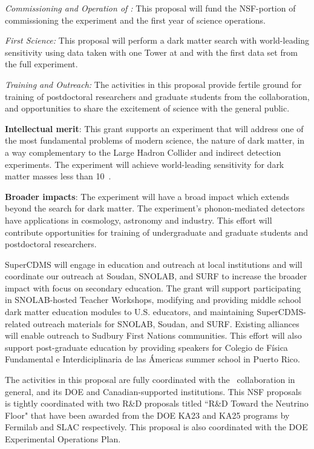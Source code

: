{\it Commissioning and Operation of \scs:} This proposal will fund the NSF-portion of commissioning the \scs experiment and the first year of science operations.

{\it First \scs Science:} This proposal will perform a dark matter search with  world-leading sensitivity using data taken with one \scs Tower at \cute and with the first data set from the full \scs experiment.

{\it Training and Outreach:} The activities in this proposal provide fertile ground for training of postdoctoral researchers and graduate students from the \SuperCDMS collaboration, and opportunities to share the excitement of science with the general public.

\textbf{Intellectual merit}: This grant supports an experiment that will address one of the most fundamental problems of modern science, the nature of dark matter, in a way complementary to the Large Hadron Collider and indirect detection experiments. The \scs experiment will achieve world-leading sensitivity for dark matter  masses less than 10~\gev.

\textbf{Broader impacts}: The \scs experiment will have a broad impact which extends beyond the search for dark matter. The experiment's phonon-mediated detectors have applications in cosmology, astronomy and industry. This effort will contribute opportunities for training of undergraduate and graduate students and postdoctoral researchers.

SuperCDMS will engage in education and outreach at local institutions and will coordinate our outreach at Soudan, SNOLAB, and SURF to increase the broader impact with focus on secondary education. The grant will support participating in SNOLAB-hosted Teacher Workshops, modifying and providing middle school dark matter education modules to U.S. educators, and maintaining SuperCDMS-related outreach materials for SNOLAB, Soudan, and SURF. Existing alliances will enable outreach to Sudbury First Nations communities. This effort will also support post-graduate education by providing speakers for Colegio de F\'{i}sica Fundamental e Interdiciplinaria de las \'{A}mericas summer school in Puerto Rico.

The activities in this proposal are fully coordinated with the \SuperCDMS\ collaboration in general, and its DOE and Canadian-supported institutions. This NSF proposals is tightly coordinated with two R\&D proposals titled ``\SuperCDMS R\&D Toward the Neutrino Floor" that have been awarded from the DOE KA23 and KA25 programs by Fermilab and SLAC respectively. This proposal is also coordinated with the DOE \scs Experimental Operations Plan.  

